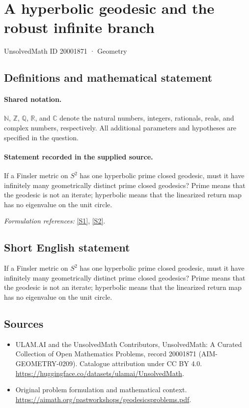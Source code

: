 \documentclass[11pt]{article}
\newcommand{\sref}[2]{\hyperlink{source:#1:#2}{[S#2]}}
\begin{document}
\setcounter{section}{20001870}
\section{A hyperbolic geodesic and the robust infinite branch}\label{20001871}
{\small UnsolvedMath ID 20001871 · Geometry}
\subsection{Definitions and mathematical statement}

\paragraph{Shared notation.}$\mathbb N$, $\mathbb Z$, $\mathbb Q$, $\mathbb R$, and $\mathbb C$ denote the natural numbers, integers, rationals, reals, and complex numbers, respectively. All additional parameters and hypotheses are specified in the question.


\paragraph{Statement recorded in the supplied source.}
If a Finsler metric on $S^2$ has one hyperbolic prime closed geodesic, must it have infinitely many geometrically distinct prime closed geodesics? Prime means that the geodesic is not an iterate; hyperbolic means that the linearized return map has no eigenvalue on the unit circle.
\par\smallskip\textit{Formulation references:} \sref{20001871}{1}, \sref{20001871}{2}.
\subsection{Short English statement}
If a Finsler metric on $S^2$ has one hyperbolic prime closed geodesic, must it have infinitely many geometrically distinct prime closed geodesics? Prime means that the geodesic is not an iterate; hyperbolic means that the linearized return map has no eigenvalue on the unit circle.
\subsection{Sources}
\begin{itemize}
\item[\hypertarget{source:20001871:1}{S1}] ULAM.AI and the UnsolvedMath Contributors, UnsolvedMath: A Curated Collection of Open Mathematics Problems, record 20001871 (AIM-GEOMETRY-0209). Catalogue attribution under CC BY 4.0.
\url{https://huggingface.co/datasets/ulamai/UnsolvedMath}.
\item[\hypertarget{source:20001871:2}{S2}] Original problem formulation and mathematical context.
\url{https://aimath.org/pastworkshops/geodesicsproblems.pdf}.
\end{itemize}
\label{end:20001871}
\end{document}

